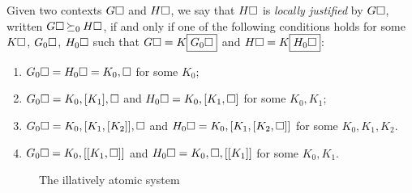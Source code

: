 \begin{definition}

  Given two contexts $G\square$ and $H\square$, we say that $H\square$ is
  \emph{locally justified} by $G\square$, written $G\square \mathbin{\succeq_0} H\square$, if and
  only if one of the following conditions holds for some $K\square$, $G_0\square$,
  $H_0\square$ such that $G\square = K\fbox{$G_0\square$}$ and $H\square =
  K\fbox{$H_0\square$}$:
  \begin{enumerate}
    \item $G_0\square = H_0\square = K_0, \square$ for some $K_0$;
    \item $G_0\square = K_0, [K_1], \square$ and $H_0\square = K_0, [K_1, \square]$ for
    some $K_0, K_1$;
    \item $G_0\square = K_0, [K_1, [K_2]], \square$ and $H_0\square = K_0, [K_1, [K_2,
    \square]]$ for some $K_0, K_1, K_2$.
    \item $G_0\square = K_0, [[K_1, \square]]$ and $H_0\square = K_0, \square, [[K_1]]$
    for some $K_0, K_1$.
  \end{enumerate}
\end{definition}

\begin{figure}
  
  \caption{The illatively atomic system }
\end{figure}

